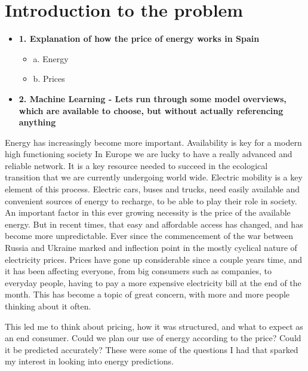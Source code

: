 \documentclass[12pt]{report} %
\begin{document}



\chapter{Introduction to the problem}
    \begin{itemize}
    \item \textbf{1. Explanation of how the price of energy works in Spain}
        \begin{itemize}
        \item a. Energy
        \item b. Prices
        \end{itemize}
    \item \textbf{2. Machine Learning - Lets run through some model overviews, which are available to choose, but without actually referencing anything}
    \end{itemize}

Energy has increasingly become more important.
Availability is key for a modern high functioning society
In Europe we are lucky to have a really advanced and reliable network.
It is a key resource needed to succeed in the ecological transition that we are currently undergoing world wide.
Electric mobility is a key element of this process.
Electric cars, buses and trucks, need easily available and convenient sources of energy to recharge, to be able to play their role in society.
An important factor in this ever growing necessity is the price of the available energy.
But in recent times, that easy and affordable access has changed, and has become more unpredictable.
Ever since the commencement of the war between Russia and Ukraine marked and inflection point in the mostly cyclical nature of electricity prices.
Prices have gone up considerable since a couple years time, and it has been affecting everyone, from big consumers such as companies, to everyday people, having to pay a more expensive electricity bill at the end of the month.
This has become a topic of great concern, with more and more people thinking about it often.

This led me to think about pricing, how it was structured, and what to expect as an end consumer.
Could we plan our use of energy according to the price?
Could it be predicted accurately?
These were some of the questions I had that sparked my interest in looking into energy predictions.
\end{document}
